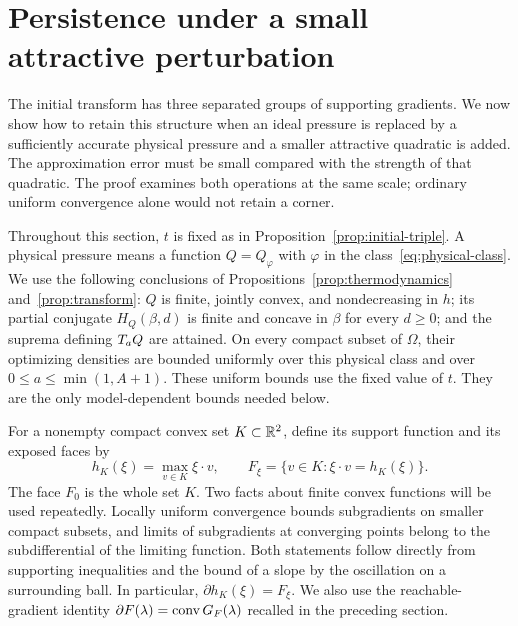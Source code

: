 \section{Persistence under a small attractive perturbation}
\label{sec:convex}

The initial transform has three separated groups of supporting gradients.
We now show how to retain this structure when an ideal pressure is replaced
by a sufficiently accurate physical pressure and a smaller attractive
quadratic is added. The approximation error must be small compared with
the strength of that quadratic. The proof examines both operations at the
same scale; ordinary uniform convergence alone would not retain a corner.

Throughout this section, $t$ is fixed as in
Proposition~\ref{prop:initial-triple}. A physical pressure means a function
$Q=Q_\varphi$ with $\varphi$ in the class~\eqref{eq:physical-class}.
We use the following conclusions of
Propositions~\ref{prop:thermodynamics} and~\ref{prop:transform}:
$Q$ is finite, jointly convex, and
nondecreasing in $h$; its partial conjugate $H_Q(\beta,d)$ is finite and
concave in $\beta$ for every $d\geq0$; and the suprema defining
$T_aQ$ are attained. On every compact subset of $\Omega$, their optimizing
densities are bounded uniformly over this physical class and over
$0\leq a\leq\min(1,A+1)$. These uniform bounds use the fixed value of $t$.
They are the only model-dependent bounds needed below.

For a nonempty compact convex set $K\subset\mathbb R^2$, define its support
function and its exposed faces by
\begin{equation}
 h_K(\xi)=\max_{v\in K}\xi\cdot v,
 \qquad
 F_\xi=\{v\in K:\xi\cdot v=h_K(\xi)\}.
 \label{eq:support-face}
\end{equation}
The face $F_0$ is the whole set $K$. Two facts about finite convex
functions will be used repeatedly. Locally uniform convergence bounds
subgradients on smaller compact subsets, and limits of subgradients at
converging points belong to the subdifferential of the limiting function.
Both statements follow directly from supporting inequalities and the
bound of a slope by the oscillation on a surrounding ball. In particular,
$\partial h_K(\xi)=F_\xi$. We also use the reachable-gradient identity
$\partial F(\lambda)=\operatorname{conv} G_F(\lambda)$ recalled in the preceding section.

